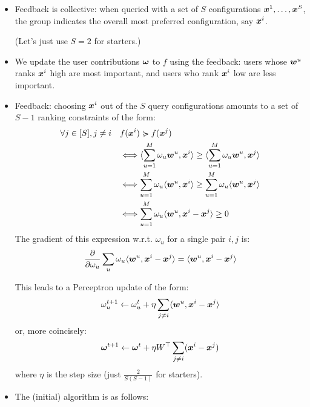 \documentclass[12pt,a4paper]{article}
\begin{document}
\begin{itemize}

    \item Feedback is collective: when queried with a set of $S$ configurations
        $\boldsymbol{x}^1, \ldots, \boldsymbol{x}^S$, the group indicates the overall most preferred
        configuration, say $\boldsymbol{x}^i$.

        (Let's just use $S = 2$ for starters.)

    \item We update the user contributions $\boldsymbol{\omega}$ to $f$ using the
        feedback: users whose $\boldsymbol{w}^u$ ranks $\boldsymbol{x}^i$ high are most important,
        and users who rank $\boldsymbol{x}^i$ low are less important.

    \item Feedback: choosing $\boldsymbol{x}^i$ out of the $S$ query configurations
        amounts to a set of $S - 1$ ranking constraints of the form:
        \begin{align*}
            \forall j \in [S], j \ne i
                & \quad f(\boldsymbol{x}^i) \succcurlyeq f(\boldsymbol{x}^j)    \\
                & \quad \Longleftrightarrow \langle \sum_{u=1}^M \omega_u \boldsymbol{w}^u, \boldsymbol{x}^i \rangle \ge \langle \sum_{u=1}^M \omega_u \boldsymbol{w}^u, \boldsymbol{x}^j \rangle \\
                & \quad \Longleftrightarrow  \sum_{u=1}^M \omega_u \langle \boldsymbol{w}^u, \boldsymbol{x}^i \rangle \ge \sum_{u=1}^M \omega_u \langle \boldsymbol{w}^u, \boldsymbol{x}^j \rangle \\
                & \quad \Longleftrightarrow  \sum_{u=1}^M \omega_u \langle \boldsymbol{w}^u, \boldsymbol{x}^i - \boldsymbol{x}^j \rangle \ge 0
        \end{align*}
        The gradient of this expression w.r.t. $\omega_u$ for a single pair
        $i, j$ is:
        $$ \frac{\partial}{\partial \omega_u} \sum_u \omega_u \langle \boldsymbol{w}^u, \boldsymbol{x}^i - \boldsymbol{x}^j \rangle = \langle \boldsymbol{w}^u, \boldsymbol{x}^i - \boldsymbol{x}^j \rangle $$

        This leads to a Perceptron update of the form:
        $$ \omega^{t+1}_u \gets \omega^t_u + \eta \sum_{j \ne i} \langle \boldsymbol{w}^u, \boldsymbol{x}^i - \boldsymbol{x}^j \rangle $$
        or, more coincisely:
        $$ \boldsymbol{\omega}^{t+1} \gets \boldsymbol{\omega}^t + \eta W^\top \sum_{j \ne i} (\boldsymbol{x}^i - \boldsymbol{x}^j) $$
        where $\eta$ is the step size (just $\frac{2}{S(S - 1)}$ for starters).

    \item The (initial) algorithm is as follows:

        \begin{itemize}


\end{itemize}
\end{itemize}
\end{document}

